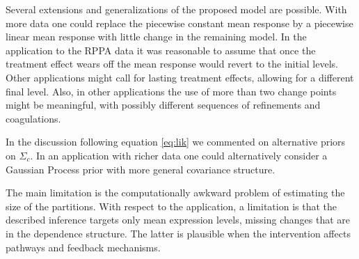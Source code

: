 Several extensions and generalizations of the proposed model are
possible. With more data one could replace the piecewise constant
mean response by a piecewise linear mean response with little change
in the remaining model. In the application to the RPPA data it was
reasonable to assume that once the treatment effect wears off the mean
response would revert to the initial levels. Other applications might
call for lasting treatment effects, allowing for a different final
level. Also, in other applications the use of more than two change
points might be meaningful, with possibly different sequences of
refinements and coagulations.

In the discussion following equation \eqref{eq:lik} we commented on alternative priors on $\Sigma_c$. In an application with richer data one could alternatively consider a Gaussian Process prior with more general covariance structure.

The main limitation is the computationally awkward problem of estimating
the size of the partitions. With respect to the application, a limitation
is that the described inference targets only mean expression levels,
missing changes that are in the dependence structure. The latter is
plausible when the intervention affects pathways and feedback mechanisms.
